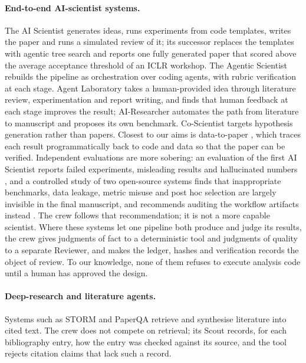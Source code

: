 \documentclass[11pt]{article}
\begin{document}
\paragraph{End-to-end AI-scientist systems.} The AI Scientist \citep{lu2024aiscientist}
generates ideas, runs experiments from code templates, writes the paper and runs a
simulated review of it; its successor \citep{yamada2025aiscientistv2} replaces the
templates with agentic tree search and reports one fully generated paper that scored
above the average acceptance threshold of an ICLR workshop. The Agentic Scientist
\citep{lange2026agentic} rebuilds the pipeline as orchestration over coding agents, with
rubric verification at each stage. Agent Laboratory \citep{schmidgall2025agentlab} takes
a human-provided idea through literature review, experimentation and report writing,
and finds that human feedback at each stage improves the result; AI-Researcher
\citep{tang2025airesearcher} automates the path from literature to manuscript and
proposes its own benchmark. Co-Scientist \citep{gottweis2026coscientist} targets
hypothesis generation rather than papers. Closest to our aims is data-to-paper
\citep{ifargan2025datatopaper}, which traces each result programmatically back to code
and data so that the paper can be verified. Independent evaluations are more sobering:
an evaluation of the first AI Scientist reports failed experiments, misleading results and
hallucinated numbers \citep{beel2025sakana}, and a controlled study of two open-source
systems finds that inappropriate benchmarks, data leakage, metric misuse and post hoc
selection are largely invisible in the final manuscript, and recommends auditing the
workflow artifacts instead \citep{luo2026pitfalls}. The crew follows that recommendation;
it is not a more capable scientist. Where these systems let one pipeline both produce and
judge its results, the crew gives judgments of fact to a deterministic tool and
judgments of quality to a separate Reviewer, and makes the ledger, hashes and
verification records the object of review. To our knowledge, none of them refuses to
execute analysis code until a human has approved the design.

\paragraph{Deep-research and literature agents.} Systems such as STORM
\citep{shao2024storm} and PaperQA \citep{lala2023paperqa} retrieve and synthesise
literature into cited text. The crew does not compete on retrieval; its Scout records,
for each bibliography entry, how the entry was checked against its source, and the tool
rejects citation claims that lack such a record.
\end{document}
